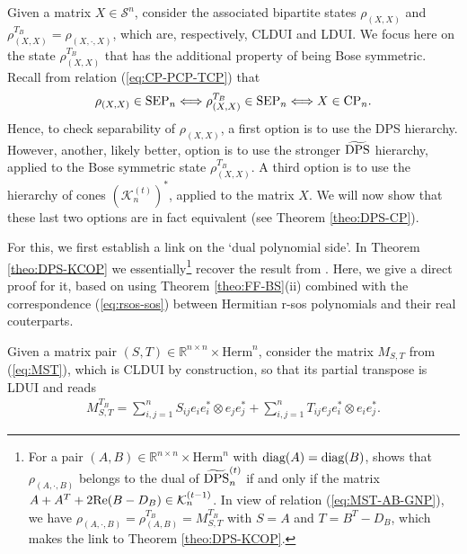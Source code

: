 \documentclass[11pt]{article}
\newcommand{\R}{\ensuremath{\mathbb{R}}}   %
\newcommand{\MS}{{\mathcal S}}
\newcommand{\MK}{{\mathcal K}}
\newcommand{\Herm}{\mathrm{Herm}}
\newcommand{\MKt}{\MK^{(t)}}
\newcommand{\SEP}{\text{\rm SEP}}
\newcommand{\CP}{\text{\rm CP}}
\newcommand{\DPS}{\text{\rm DPS}}
\newcommand{\tilDPS}{\widetilde {\DPS}}
\newcommand{\tilDPSt}{\widetilde{\DPS}^{(t)}}
\newcommand{\diag}{\text{\rm diag}}
\newcommand{\Rea}{\text{\rm Re}}
\theoremstyle{plain}
\begin{document}
Given a matrix $X\in \MS^n$, consider the associated bipartite states
$\rho_{(X,X)}$ and $ \rho_{(X,X)}^{T_B}=\rho_{(X,\cdot,X)}$, which  are, respectively, CLDUI and LDUI. We focus here on the state $ \rho_{(X,X)}^{T_B}$ that has the additional property of being Bose symmetric.  
Recall from relation (\ref{eq:CP-PCP-TCP}) that
$$\rho_{(X,X)}\in\SEP_n\Longleftrightarrow \rho_{(X,X)}^{T_B} \in \SEP_n\Longleftrightarrow X\in \CP_n.$$
Hence, to check separability of $\rho_{(X,X)}$, a first option is to  use the DPS hierarchy. However, another, likely better, option is to use the stronger $\tilDPS$ hierarchy, applied to the Bose symmetric state $\rho_{(X,X)}^{T_B}$. A third option is to use the  hierarchy of cones $(\MKt_n)^*$, applied to the matrix $X$. We will now  
show that  these last two options  are in fact
 equivalent (see Theorem \ref{theo:DPS-CP}).

\medskip
For this, we first establish a link on the `dual polynomial side'. In Theorem \ref{theo:DPS-KCOP} we essentially\footnote{For a pair $(A,B)\in \R^{n\times n}\times  \Herm^n$ with $\diag(A)=\diag(B)$,  \cite[Theorem 8.11]{GNP_2025} shows that    $\rho_{(A,\cdot,B)}$ belongs to the dual of {$\tilDPSt_n$} if and only if the matrix $A+A^T+ 2\Rea(B-D_B)\in\MK^{(t-1)}_n$. In view of relation (\ref{eq:MST-AB-GNP}), we have $\rho_{(A,\cdot,B)}=\rho_{(A,B)}^{T_B}= M_{S,T}^{T_B}$ with $S=A$ and $T=B^T-D_B$, which makes the link to Theorem \ref{theo:DPS-KCOP}.}
 recover the result from \cite[Theorem 8.11]{GNP_2025}. Here, we give a direct proof for it, 
based on using   Theorem \ref{theo:FF-BS}(ii) combined with the  correspondence (\ref{eq:rsos-sos}) between Hermitian r-sos polynomials and their real couterparts.

Given  a matrix pair $(S,T)\in \R^{n\times n}\times \Herm^n$, consider the matrix $M_{S,T}$ from    (\ref{eq:MST}), which is CLDUI by construction, so that its partial transpose is LDUI and  reads
\begin{align}\label{eq:MST-TB}
	M_{S,T}^{T_B} 
	=\sum_{i,j=1}^nS_{ij}e_ie_i^*\otimes e_je_j^*+\sum_{i,j=1}^nT_{ij}e_je_i^*\otimes e_ie_j^*.
	\end{align}
	
\end{document}
